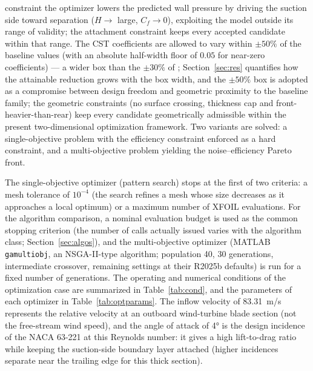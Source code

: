 \documentclass[preprint,3p,times]{elsarticle}
\begin{document}
constraint the optimizer lowers the predicted wall pressure by driving the
suction side toward separation ($H\!\to\!$ large, $C_f\!\to\!0$), exploiting the
model outside its range of validity; the attachment constraint keeps every
accepted candidate within that range. The CST coefficients are allowed to vary
within $\pm 50\%$ of the baseline values (with an absolute half-width floor of
$0.05$ for near-zero coefficients) --- a wider box than the $\pm30\%$ of \citet{Kou2023};
Section~\ref{sec:res} quantifies how the attainable reduction grows with the
box width, and the $\pm50\%$ box is adopted as a compromise between design
freedom and geometric proximity to the baseline family; the geometric constraints
(no surface crossing, thickness cap and front-heavier-than-rear) keep every
candidate geometrically admissible within the present two-dimensional
optimization framework. Two variants are solved: a single-objective problem with
the efficiency constraint enforced as a hard constraint, and a multi-objective
problem yielding the noise--efficiency Pareto front.

The single-objective optimizer (pattern search) stops at the first of two
criteria: a mesh tolerance of $10^{-4}$ (the search refines a mesh whose size
decreases as it approaches a local optimum) or a maximum number of XFOIL
evaluations. For the algorithm comparison, a nominal evaluation budget is used
as the common stopping criterion (the number of calls actually issued varies
with the algorithm class; Section~\ref{sec:algos}), and the
multi-objective optimizer (MATLAB \texttt{gamultiobj}, an NSGA-II-type
algorithm; population 40, 30 generations, intermediate crossover, remaining
settings at their R2025b defaults) is run for a fixed number of generations. The
operating and numerical conditions of the optimization case are summarized in
Table~\ref{tab:cond}, and the parameters of each optimizer in
Table~\ref{tab:optparams}. The inflow velocity of \SI{83.31}{m/s} represents the
relative velocity at an outboard wind-turbine blade section (not the free-stream
wind speed), and the angle of attack of \ang{4} is the design incidence of the
NACA 63-221 at this Reynolds number: it gives a high lift-to-drag ratio while
keeping the suction-side boundary layer attached (higher incidences separate
near the trailing edge for this thick section).
\end{document}
